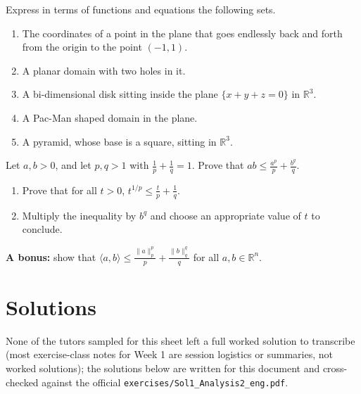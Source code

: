 \begin{exercise}
\label{ex:1.3}
Express in terms of functions and equations the following sets.
\begin{enumerate}[label=\textbf{\arabic*.}]
  \item The coordinates of a point in the plane that goes endlessly back and forth from the
    origin to the point $(-1,1)$.
  \item A planar domain with two holes in it.
  \item A bi-dimensional disk sitting inside the plane $\{x+y+z=0\}$ in $\mathbb{R}^3$.
  \item A Pac-Man shaped domain in the plane.
  \item A pyramid, whose base is a square, sitting in $\mathbb{R}^3$.
\end{enumerate}
\end{exercise}

\begin{exercise}
\label{ex:1.4}
Let $a,b > 0$, and let $p,q>1$ with $\tfrac{1}{p}+\tfrac{1}{q}=1$. Prove that
$ab \leq \tfrac{a^p}{p} + \tfrac{b^q}{q}$.
\begin{enumerate}[label=\textbf{\arabic*.}]
  \item Prove that for all $t>0$, $t^{1/p} \leq \tfrac{t}{p} + \tfrac{1}{q}$.
  \item Multiply the inequality by $b^q$ and choose an appropriate value of $t$ to conclude.
\end{enumerate}
\textbf{A bonus:} show that $\langle a,b\rangle \leq \tfrac{\|a\|_p^p}{p} + \tfrac{\|b\|_q^q}{q}$
for all $a,b \in \mathbb{R}^n$.
\end{exercise}

\section{Solutions}
\label{sec:week01_solutions}

\begin{ainote}
None of the tutors sampled for this sheet left a full worked solution to transcribe (most
exercise-class notes for Week 1 are session logistics or  summaries, not worked
solutions); the solutions below are written for this document and cross-checked against the
official \texttt{exercises/Sol1\_Analysis2\_eng.pdf}.
\end{ainote}

